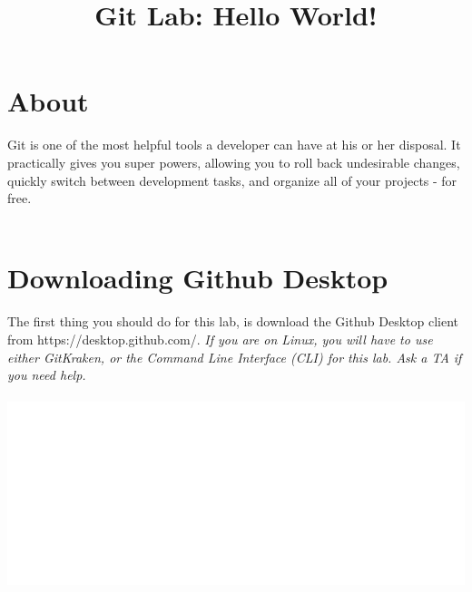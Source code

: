\documentclass[12pt, letter]{article}
\title{Git Lab: Hello World!}
\begin{document}
    \maketitle
    \tableofcontents
    
    \section{About}
    Git is one of the most helpful tools a developer can have at his or her disposal. It practically gives you super powers, allowing you to roll back undesirable changes, quickly switch between development tasks, and organize all of your projects - for free. \\ \\
    
    \section{Downloading Github Desktop}
    The first thing you should do for this lab, is download the Github Desktop client from https://desktop.github.com/. \emph{If you are on Linux, you will have to use either GitKraken, or the Command Line Interface (CLI) for this lab. Ask a TA if you need help.} \\ \\
    \includegraphics{screenshots/shot01.bmp}
    
\end{document}
